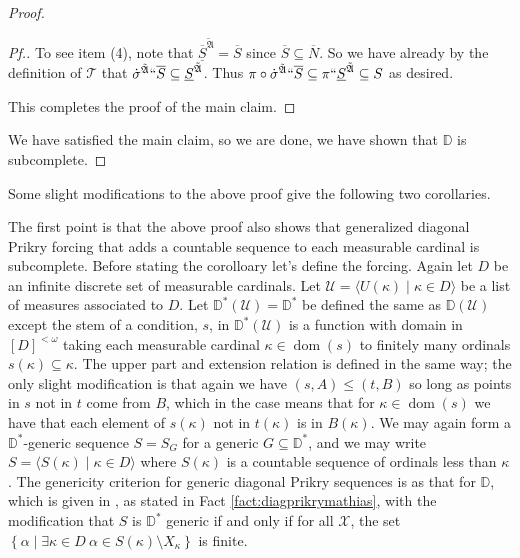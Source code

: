 \documentclass{amsart}
\theoremstyle{definition}
\theoremstyle{remark}
\newcommand{\D}{\mathbb{D}}
\newcommand{\U}{\mathcal{U}}
\DeclareMathOperator{\dom}{dom}
\newcommand{\st}{\; | \;}
\newcommand{\set}[2]{\left\{#1\st #2 \right\}}
\newcommand{\seq}[2]{\langle #1 \st #2 \rangle}
\begin{document}
\begin{proof}
\begin{proof}[Pf.]
To see item (4), note that $\overline{\underline S}^{\tilde{\mathfrak A}} = \overline S$ since $\overline S \subseteq \overline N$. So we have already by the definition of $\mathcal T$  that $\dot{\sigma}^{\tilde{\mathfrak A}}``\overline S \subseteq \underline S^{\tilde{\mathfrak A}}$. Thus $\pi \circ \dot{\sigma}^{\tilde{\mathfrak A}}``\overline S \subseteq \pi `` \underline S^{\tilde{\mathfrak A}} \subseteq S$ as desired. %

This completes the proof of the main claim.
\end{proof}
We have satisfied the main claim, so we are done, we have shown that $\D$ is subcomplete.
\end{proof}

Some slight modifications to the above proof give the following two corollaries.

The first point is that the above proof also shows that generalized diagonal Prikry forcing that adds a countable sequence to each measurable cardinal is subcomplete. Before stating the corolloary let's define the forcing. Again let $D$ be an infinite discrete set of measurable cardinals. Let $\U = \seq{ U(\kappa) }{ \kappa \in D }$ be a list of measures associated to $D$. 
Let $\D^*(\U) = \D^*$ be defined the same as $\D(\U)$ except the stem of a condition, $s$, in $\D^*(\U)$ is a function with domain in $[D]^{<\omega}$ taking each measurable cardinal $\kappa \in \dom(s)$ to finitely many ordinals $s(\kappa) \subseteq \kappa$. The upper part and extension relation is defined in the same way; the only slight modification is that again we have $(s, A) \leq (t, B)$ so long as points in $s$ not in $t$ come from $B$, which in the case means that for $\kappa \in \dom(s)$ we have that each element of $s(\kappa)$ not in $t(\kappa)$ is in $B(\kappa)$. We may again form a $\D^*$-generic sequence $S = S_G$ for a generic $G \subseteq \D^*$, and we may write $S = \seq{ S(\kappa) }{ \kappa \in D }$ where $S(\kappa)$ is a countable sequence of ordinals less than $\kappa$. The genericity criterion for generic diagonal Prikry sequences is as that for $\D$, which is given in  \cite[Theorem 1]{Fuchs:2005kx}, as stated in Fact \ref{fact:diagprikrymathias}, with the modification that $S$ is $\D^*$ generic if and only if for all $\mathcal X$, the set $\set{ \alpha }{ \exists \kappa \in D \ \alpha \in S(\kappa) \setminus X_\kappa }$ is finite.
\end{document}
